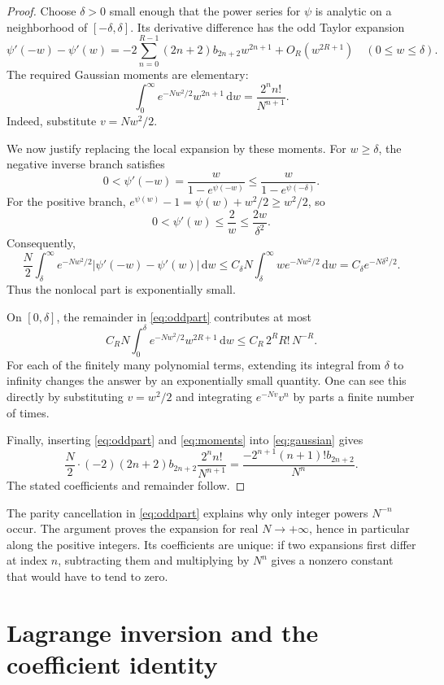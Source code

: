 \documentclass[11pt,letterpaper]{article}
\numberwithin{equation}{section}
\theoremstyle{remark}
\newcommand{\dd}{\,\mathrm{d}}
\begin{document}
\begin{proof}
Choose $\delta>0$ small enough that the power series for $\psi$ is analytic
on a neighborhood of $[-\delta,\delta]$. Its derivative difference has the
odd Taylor expansion
\begin{equation}
 \psi'(-w)-\psi'(w)
 =-2\sum_{n=0}^{R-1}(2n+2)b_{2n+2}w^{2n+1}
   +O_R(w^{2R+1})
 \quad(0\leq w\leq\delta).
 \label{eq:oddpart}
\end{equation}
The required Gaussian moments are elementary:
\begin{equation}
 \int_0^\infty e^{-Nw^2/2}w^{2n+1}\dd w
 =\frac{2^n n!}{N^{n+1}}.
 \label{eq:moments}
\end{equation}
Indeed, substitute $v=Nw^2/2$.

We now justify replacing the local expansion by these moments. For
$w\geq\delta$, the negative inverse branch satisfies
\[
 0<\psi'(-w)
 =\frac{w}{1-e^{\psi(-w)}}
 \leq\frac{w}{1-e^{\psi(-\delta)}}.
\]
For the positive branch, $e^{\psi(w)}-1=\psi(w)+w^2/2\geq w^2/2$, so
\[
 0<\psi'(w)\leq\frac2w\leq\frac{2w}{\delta^2}.
\]
Consequently,
\[
 \frac N2\int_\delta^\infty e^{-Nw^2/2}
       |\psi'(-w)-\psi'(w)|\dd w
 \leq C_\delta N\int_\delta^\infty we^{-Nw^2/2}\dd w
 =C_\delta e^{-N\delta^2/2}.
\]
Thus the nonlocal part is exponentially small.

On $[0,\delta]$, the remainder in \eqref{eq:oddpart} contributes at most
\[
 C_R N\int_0^\delta e^{-Nw^2/2}w^{2R+1}\dd w
 \leq C_R\,2^R R!\,N^{-R}.
\]
For each of the finitely many polynomial terms, extending its integral
from $\delta$ to infinity changes the answer by an exponentially small
quantity. One can see this directly by substituting $v=w^2/2$ and
integrating $e^{-Nv}v^n$ by parts a finite number of times.

Finally, inserting \eqref{eq:oddpart} and \eqref{eq:moments} into
\eqref{eq:gaussian} gives
\[
 \frac N2\cdot(-2)(2n+2)b_{2n+2}
        \frac{2^n n!}{N^{n+1}}
 =\frac{-2^{n+1}(n+1)!b_{2n+2}}{N^n}.
\]
The stated coefficients and remainder follow.
\end{proof}

The parity cancellation in \eqref{eq:oddpart} explains why only integer
powers $N^{-n}$ occur. The argument proves the expansion for real
$N\to+\infty$, hence in particular along the positive integers.
Its coefficients are unique: if two expansions first differ at index
$n$, subtracting them and multiplying by $N^n$ gives a nonzero constant
that would have to tend to zero.

\section{Lagrange inversion and the coefficient identity}
\label{sec:lagrange}
\end{document}
